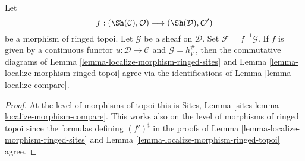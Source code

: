 \begin{lemma}
\label{lemma-localize-morphism-compare}
Let
$$
f :
(\Sh(\mathcal{C}), \mathcal{O})
\longrightarrow
(\Sh(\mathcal{D}), \mathcal{O}')
$$
be a morphism of ringed topoi.
Let $\mathcal{G}$ be a sheaf on $\mathcal{D}$.
Set $\mathcal{F} = f^{-1}\mathcal{G}$.
If $f$ is given by a continuous functor $u : \mathcal{D} \to \mathcal{C}$
and $\mathcal{G} = h_V^\#$, then the commutative diagrams of
Lemma \ref{lemma-localize-morphism-ringed-sites}
and
Lemma \ref{lemma-localize-morphism-ringed-topoi}
agree via the identifications of
Lemma \ref{lemma-localize-compare}.
\end{lemma}

\begin{proof}
At the level of morphisms of topoi this is
Sites, Lemma \ref{sites-lemma-localize-morphism-compare}.
This works also on the level of morphisms of ringed topoi since
the formulas defining $(f')^\sharp$ in the proofs of
Lemma \ref{lemma-localize-morphism-ringed-sites}
and
Lemma \ref{lemma-localize-morphism-ringed-topoi}
agree.
\end{proof}

